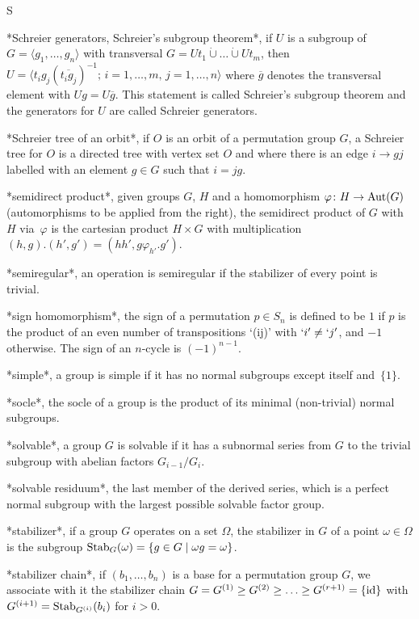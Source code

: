  S

*Schreier generators, Schreier's subgroup theorem*,  if $U$ is a subgroup
of      $G=\langle    g_1,\ldots,g_n\rangle$   with  transversal  $G=Ut_1
\mathbin{\dot\cup}  \ldots \mathbin{\dot\cup}  Ut_m$,  then  $U = \langle
t_ig_j (\overline{t_ig_j})^{-1};\, i=1,\ldots,m, \, j=1,\ldots,n \rangle$
where $\overline g$  denotes the transversal element with  $Ug=U\overline
g$.   This statement  is   called  Schreier's subgroup  theorem  and  the
generators for $U$ are called Schreier generators.

*Schreier tree of an  orbit*, if $O$  is an orbit  of a permutation group
$G$, a Schreier tree for $O$  is a directed tree with  vertex set $O$ and
where there is an edge $i \to g j$ labelled with an element $g\in G$
such that $i=jg$.

*semidirect   product*, given   groups    $G$, $H$   and  a  homomorphism
$\varphi\colon H\to {\rm Aut}(G)$ (automorphisms  to be applied from  the
right),  the semidirect product  of  $G$  with~$H$ via~$\varphi$  is  the
cartesian  product $H\times  G$   with  multiplication  $(h,g).(h',g')  =
(hh',g\varphi_{h'}.g')$.

*semiregular*, an operation  is semiregular if   the stabilizer of  every
point is trivial.

*sign homomorphism*,  the sign of a  permutation $p\in S_n$ is defined to
be $1$ if $p$  is the product of an  even number of transpositions `(ij)'
with   $`i' \ne `j'$, and  $-1$  otherwise. The  sign  of an $n$-cycle is
$(-1)^{n-1}$.

*simple*, a group  is simple if it has  no normal subgroups except itself
and~$\{1\}$.

*socle*, the socle of a group is the product of its minimal (non-trivial)
normal subgroups.

*solvable*, a group $G$ is solvable if it has a subnormal series from $G$
to the trivial subgroup with abelian factors $G_{i-1}/G_i$.

*solvable residuum*,  the last member of the  derived series, which  is a
perfect normal subgroup with the largest possible solvable factor group.

*stabilizer*,  if a group $G$ operates  on a set $\Omega$, the stabilizer
in $G$ of a point $\omega\in\Omega$ is the subgroup ${\rm Stab}_G(\omega)
= \{g\in G\mid \omega g=\omega\}$.

*stabilizer  chain*, if $(b_1,\ldots,b_n)$   is a base  for a permutation
group $G$, we  associate with it the stabilizer  chain  $G = G^{(1)}  \ge
G^{(2)}  \ge  \ldots \ge G^{(r+1)}  =  \{{\rm id}\}$ with $G^{(i+1)}={\rm
Stab}_{G^{(i)}}(b_i)$ for $i>0$.

